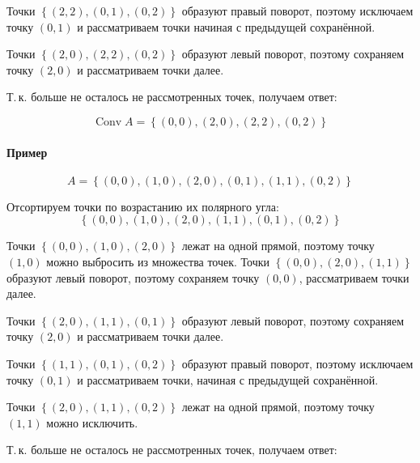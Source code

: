 \documentclass[a4paper,12pt,notitlepage,headsepline,pdftex]{scrartcl}
\begin{document}
        Точки $\left\{ (2, 2), (0, 1), (0, 2) \right\}$ образуют правый
        поворот, поэтому исключаем точку $(0, 1)$ и рассматриваем точки
        начиная с предыдущей сохранённой.

        Точки $\left\{ (2, 0), (2, 2), (0, 2) \right\}$ образуют левый
        поворот, поэтому сохраняем точку $(2, 0)$ и рассматриваем точки далее.

        Т.\,к. больше не осталось не рассмотренных точек, получаем ответ:

        \begin{equation*}
          \mathop{Conv} A = \left\{ (0, 0), (2, 0), (2, 2), (0, 2) \right\}
        \end{equation*}


      \paragraph{Пример }
        \begin{equation*}
          A = \left\{ (0, 0), (1, 0), (2, 0),
                      (0, 1), (1, 1),
                      (0, 2) \right\}
        \end{equation*}

        Отсортируем точки по возрастанию их полярного угла:
        \begin{equation*}
          \left\{ (0, 0), (1, 0), (2, 0),
                  (1, 1), (0, 1), (0, 2) \right\}
        \end{equation*}

        Точки $\left\{ (0, 0), (1, 0), (2, 0) \right\}$ лежат на одной прямой,
        поэтому точку $(1, 0)$ можно выбросить из множества точек.
        Точки $\left\{ (0, 0), (2, 0), (1, 1) \right\}$ образуют левый
        поворот, поэтому сохраняем точку $(0, 0)$, рассматриваем точки далее.

        Точки $\left\{ (2, 0), (1, 1), (0, 1)\right\}$ образуют левый поворот,
        поэтому сохраняем точку $(2, 0)$ и рассматриваем точки далее.

        Точки $\left\{ (1, 1), (0, 1), (0, 2) \right\}$ образуют правый
        поворот, поэтому исключаем точку $(0, 1)$ и рассматриваем точки,
        начиная с предыдущей сохранённой.

        Точки $\left\{ (2, 0), (1, 1), (0, 2) \right\}$ лежат на одной прямой,
        поэтому точку $(1, 1)$ можно исключить.

        Т.\,к. больше не осталось не рассмотренных точек, получаем ответ:
\end{document}
